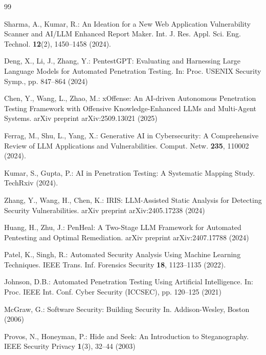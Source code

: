\documentclass[runningheads]{llncs}
\begin{document}
\begin{thebibliography}{99}

Sharma, A., Kumar, R.: An Ideation for a New Web Application Vulnerability Scanner and AI/LLM Enhanced Report Maker. Int. J. Res. Appl. Sci. Eng. Technol. \textbf{12}(2), 1450--1458 (2024). 

Deng, X., Li, J., Zhang, Y.: PentestGPT: Evaluating and Harnessing Large Language Models for Automated Penetration Testing. In: Proc. USENIX Security Symp., pp. 847--864 (2024)

Chen, Y., Wang, L., Zhao, M.: xOffense: An AI-driven Autonomous Penetration Testing Framework with Offensive Knowledge-Enhanced LLMs and Multi-Agent Systems. arXiv preprint arXiv:2509.13021 (2025)

Ferrag, M., Shu, L., Yang, X.: Generative AI in Cybersecurity: A Comprehensive Review of LLM Applications and Vulnerabilities. Comput. Netw. \textbf{235}, 110002 (2024). 

Kumar, S., Gupta, P.: AI in Penetration Testing: A Systematic Mapping Study. TechRxiv (2024). 

Zhang, Y., Wang, H., Chen, K.: IRIS: LLM-Assisted Static Analysis for Detecting Security Vulnerabilities. arXiv preprint arXiv:2405.17238 (2024)

Huang, H., Zhu, J.: PenHeal: A Two-Stage LLM Framework for Automated Pentesting and Optimal Remediation. arXiv preprint arXiv:2407.17788 (2024)

Patel, K., Singh, R.: Automated Security Analysis Using Machine Learning Techniques. IEEE Trans. Inf. Forensics Security \textbf{18}, 1123--1135 (2022). 

Johnson, D.B.: Automated Penetration Testing Using Artificial Intelligence. In: Proc. IEEE Int. Conf. Cyber Security (ICCSEC), pp. 120--125 (2021)

McGraw, G.: Software Security: Building Security In. Addison-Wesley, Boston (2006)

Provos, N., Honeyman, P.: Hide and Seek: An Introduction to Steganography. IEEE Security Privacy \textbf{1}(3), 32--44 (2003)


\end{thebibliography}
\end{document}
